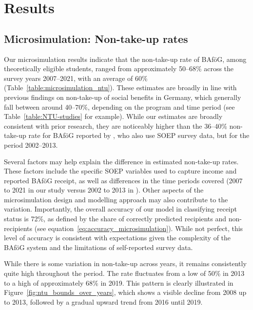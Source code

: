 %
%

\section{Results}

\subsection{Microsimulation: Non-take-up rates}

Our microsimulation results indicate that the non-take-up rate of BAföG, among theoretically eligible students, ranged from approximately 50--68\% across the survey years 2007--2021, with an average of 60\% (Table~\ref{table:microsimulation_ntu}). These estimates are broadly in line with previous findings on non-take-up of social benefits in Germany, which generally fall between around 40--70\%, depending on the program and time period (see Table~\ref{table:NTU-studies} for example). While our estimates are broadly consistent with prior research, they are noticeably higher than the 36--40\% non-take-up rate for BAföG reported by \cite{herber_non-take-up_2019}, who also use SOEP survey data, but for the period 2002--2013.

Several factors may help explain the difference in estimated non-take-up rates. These factors include the specific SOEP variables used to capture income and reported BAföG receipt, as well as differences in the time periods covered (2007 to 2021 in our study versus 2002 to 2013 in \cite{herber_non-take-up_2019}). Other aspects of the microsimulation design and modelling approach may also contribute to the variation. Importantly, the overall accuracy of our model in classifying receipt status is 72\%, as defined by the share of correctly predicted recipients and non-recipients (see equation~\ref{eq:accuracy_microsimulation}). While not perfect, this level of accuracy is consistent with expectations given the complexity of the BAföG system and the limitations of self-reported survey data.




While there is some variation in non-take-up across years, it remains consistently quite high throughout the period. 
The rate fluctuates from a low of 50\% in 2013 to a high of approximately 68\% in 2019. 
This pattern is clearly illustrated in Figure~\ref{fig:ntu_bounds_over_years}, which shows a visible decline from 2008 up to 2013, followed by a gradual upward trend from 2016 until 2019. 

